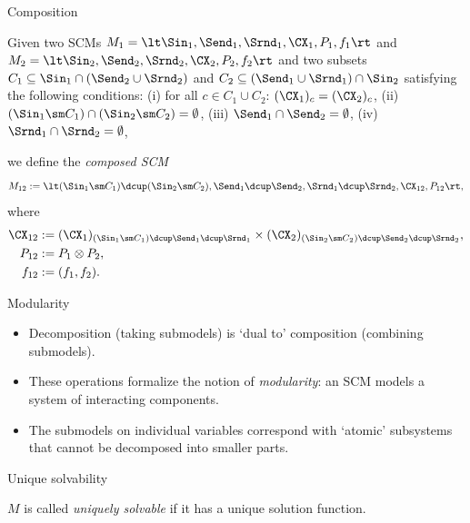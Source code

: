 \begin{frame}{Composition}
\begin{Def}\label{def:compose_scm}
  Given two SCMs $M_1 = \lt \Sin_1, \Send_1, \Srnd_1, \CX_1, P_1, f_1 \rt$ and $M_2 = \lt \Sin_2, \Send_2, \Srnd_2, \CX_2, P_2, f_2 \rt$ and two subsets $C_1 \subseteq \Sin_1 \cap (\Send_2 \cup \Srnd_2)$ and $C_2 \subseteq (\Send_1 \cup \Srnd_1) \cap \Sin_2$ satisfying the following conditions:
  (i) for all $c \in C_1 \cup C_2$: $(\CX_1)_c = (\CX_2)_c$,
  (ii) $(\Sin_1 \sm C_1) \cap (\Sin_2 \sm C_2) = \emptyset$,
  (iii) $\Send_1 \cap \Send_2 = \emptyset$,
  (iv) $\Srnd_1 \cap \Srnd_2 = \emptyset$,

  we define the \emph{composed SCM}
  $$M_{12} := \lt (\Sin_1 \sm C_1) \dcup (\Sin_2 \sm C_2), \Send_1 \dcup \Send_2, \Srnd_1 \dcup \Srnd_2, \CX_{12}, P_{12} \rt,$$
  where
  \begin{align*}
    \CX_{12} &:= (\CX_1)_{(\Sin_1 \sm C_1) \dcup \Send_1 \dcup \Srnd_1} \times (\CX_2)_{(\Sin_2 \sm C_2) \dcup \Send_2 \dcup \Srnd_2}, \\
    P_{12} &:= P_1 \otimes P_2, \\
    f_{12} &:= (f_1, f_2).
  \end{align*}
\end{Def}
\end{frame}

\begin{frame}{Modularity}
  \begin{itemize}
    \item Decomposition (taking submodels) is `dual to' composition (combining submodels).
    \item These operations formalize the notion of \emph{modularity}: an SCM models a system of interacting components.
    \item The submodels on individual variables correspond with `atomic' subsystems that cannot be decomposed into smaller parts.
  \end{itemize}
\end{frame}

\begin{frame}{Unique solvability}
\begin{definition}
  $M$ is called \emph{uniquely solvable} if it has a unique solution function. 
\end{definition}
%
\end{frame}

